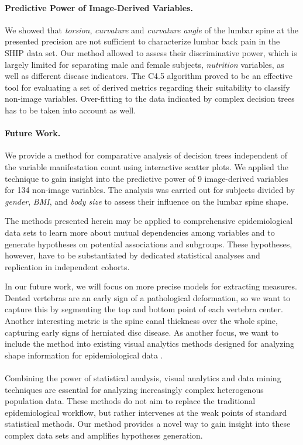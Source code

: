 \documentclass[a4paper,twoside]{style/article}
\begin{document}
\paragraph{Predictive Power of Image-Derived Variables.}
We showed that \emph{torsion}, \emph{curvature} and \emph{curvature angle} of the lumbar spine at the presented precision are not sufficient to characterize lumbar back pain in the SHIP data set.
Our method allowed to assess their discriminative power, which is largely limited for separating male and female subjects, \emph{nutrition} variables, as well as different disease indicators.
The C4.5 algorithm proved to be an effective tool for evaluating a set of derived metrics regarding their suitability to classify non-image variables.
Over-fitting to the data indicated by complex decision trees has to be taken into account as well.
\paragraph{Future Work.}
We provide a method for comparative analysis of decision trees independent of the variable manifestation count using interactive scatter plots.
We applied the technique to gain insight into the predictive power of 9 image-derived variables for 134 non-image variables.
The analysis was carried out for subjects divided by \emph{gender}, \emph{BMI}, and \emph{body size} to assess their influence on the lumbar spine shape.

The methods presented herein may be applied to comprehensive epidemiological data sets to learn more about mutual dependencies among variables and to generate hypotheses on potential associations and subgroups.
%
These hypotheses, however, have to be substantiated by dedicated statistical analyses and replication in independent cohorts.

In our future work, we will focus on more precise models for extracting measures.
Dented vertebras are an early sign of a pathological deformation, so we want to capture this by segmenting the top and bottom point of each vertebra center.
Another interesting metric is the spine canal thickness over the whole spine, capturing early signs of herniated disc disease.
As another focus, we want to include the method into existing visual analytics methods designed for analyzing shape information for epidemiological data \cite{Klemm2014VIS}.
\\\\
Combining the power of statistical analysis, visual analytics and data mining techniques are essential for analyzing increasingly complex heterogenous population data.
These methods do not aim to replace the traditional epidemiological workflow, but rather intervenes at the weak points of standard statistical methods.
Our method provides a novel way to gain insight into these complex data sets and amplifies hypotheses generation.
\end{document}
